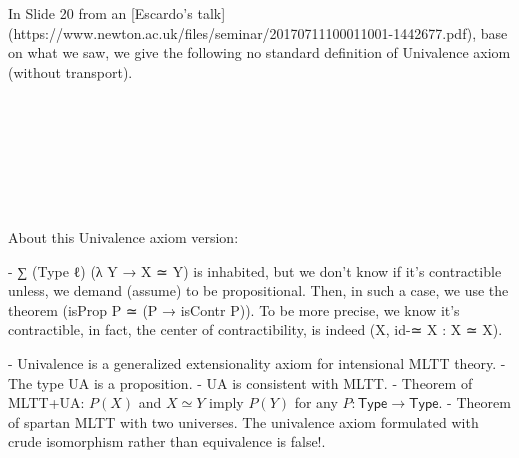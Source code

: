 In Slide 20 from an [Escardo's talk](https://www.newton.ac.uk/files/seminar/20170711100011001-1442677.pdf), base on what we saw, we give
the following no standard definition of Univalence axiom (without transport).

\begin{code}%
%
\>[2]\<%
\\
\>[2][@{}l@{\AgdaIndent{0}}]%
\>[4]\AgdaSymbol{:}\AgdaSpace{}%
\AgdaSpace{}%
\AgdaSymbol{\{}\AgdaSymbol{\}}\<%
\\
%
\>[4]\AgdaSpace{}%
\AgdaSymbol{(}\AgdaSpace{}%
\AgdaSymbol{(}\AgdaSpace{}%
\AgdaSymbol{))}\<%
\\
\>[0]\<%
\\
%
\>[2]\AgdaSpace{}%
\AgdaSymbol{\{}\AgdaSpace{}%
\AgdaSymbol{=}\AgdaSpace{}%
\AgdaSymbol{\}}%
\>[14]\AgdaSymbol{=}\<%
\\
\>[2][@{}l@{\AgdaIndent{0}}]%
\>[4]\AgdaSymbol{(}\AgdaSpace{}%
\AgdaSymbol{:}\AgdaSpace{}%
\AgdaSpace{}%
\AgdaSymbol{)}\AgdaSpace{}%
\AgdaSpace{}%
\AgdaSpace{}%
\AgdaSymbol{(}\AgdaSpace{}%
\AgdaSpace{}%
\AgdaSymbol{(}\AgdaSpace{}%
\AgdaSymbol{)}\AgdaSpace{}%
\AgdaSpace{}%
\AgdaSpace{}%
\AgdaSpace{}%
\AgdaSymbol{(}\AgdaSpace{}%
\AgdaSpace{}%
\AgdaSymbol{)}\AgdaSpace{}%
\AgdaSymbol{))}\<%
\\
%
\>[4]\AgdaSpace{}%
\AgdaSpace{}%
%
\>[23]\<%
\end{code}

About this Univalence axiom version:

  - ∑ (Type ℓ) (λ Y → X ≃ Y) is inhabited, but we don't know if it's contractible
  unless, we demand (assume) to be propositional. Then, in such a case,
  we use the theorem (isProp P ≃ (P → isContr P)). To be more precise, we know it's contractible, in fact, the center of contractibility, is indeed (X, id-≃ X : X ≃ X).
  
  - Univalence is a generalized extensionality axiom for intensional MLTT theory.
  - The type UA is a proposition.
  - UA is consistent with MLTT.
  - Theorem of MLTT+UA: $P(X)$ and $X≃Y$ imply $P(Y)$ for any $P : \mathsf{Type} → \mathsf{Type}$.
  - Theorem of spartan MLTT with two universes. The univalence axiom formulated
with crude isomorphism rather than equivalence is false!.

